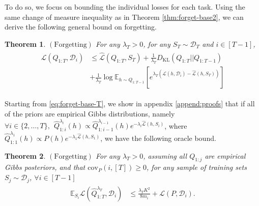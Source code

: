 \documentclass{article}
\theoremstyle{plain}
\newtheorem{theorem}{Theorem}[section]
\theoremstyle{definition}
\theoremstyle{remark}
\newcommand{\RM}[1]{{\textcolor{magenta}{#1}}}
\begin{document}
To do so, we focus on bounding the individual losses for each task.
Using the same change of measure inequality as in Theorem \ref{thm:forget-base2}, we can derive the following general bound on forgetting. 
%
\begin{theorem} $\mathrm{(Forgetting)}$
For any $\lambda_T>0$, for any $S_T\sim \mathcal{D}_T$ and $i\in [T-1]$,
%
\begin{align} \label{eq:forget-base-T}
\begin{split}
\mathcal{L}(Q_{1:T}, \mathcal{D}_i) &\leq \hat{\mathcal{L}}(Q_{1:T}, S_T)+ \frac{1}{\lambda_T} D_{\mathrm{KL}}(Q_{1:T}||Q_{1:T-1})
\\&+\frac{1}{\lambda_T}\log\mathbb{E}_{h\sim Q_{1:T-1}}\left [e^{\lambda_T(\mathcal{L}(h,\mathcal{D}_i)-\hat{\mathcal{L}}(h,S_T))} \right ]
\end{split}
\end{align}
\end{theorem}
%
Starting from \eqref{eq:forget-base-T}, we show in appendix \ref{append:proofs} that if all of the priors are empirical Gibbs distributions, namely  
$\forall i\in\{2,\ldots,T\}, ~~\hat{Q}^{\lambda_i}_{1:i}(h)\propto \hat{Q}^{\lambda_{i-1}}_{1:i-1}(h)e^{-\lambda_i\hat{\mathcal{L}}(h,S_i)}$,  
where $\hat{Q}^{\lambda_1}_{1:1}(h)\propto P(h)e^{-\lambda_1\hat{\mathcal{L}}(h,S_1)}$, we have the following oracle bound.
%
\begin{theorem} $\mathrm{(Forgetting)}$ \label{thm:forgetting-extended}
For any $\lambda_T>0$, assuming all $Q_{1:j}$ are empirical Gibbs posteriors, and that
 $\mathrm{cov}_{P}(i, [T])\geq 0$,
for any sample of training sets $S_{j}\sim \mathcal{D}_j$, $\forall i\in[T-1]$
%
\begin{align} \label{eq:forgetting-extended}
\begin{split}
\mathbb{E}_{S_i}\mathcal{L}(\hat{Q}^{\lambda_T}_{1:T}, \mathcal{D}_i) &\leq \frac{\lambda_T K^2}{8m_i}+\mathcal{L}(P,\mathcal{D}_i).
\end{split}
\end{align}
\end{theorem}
%
\end{document}

